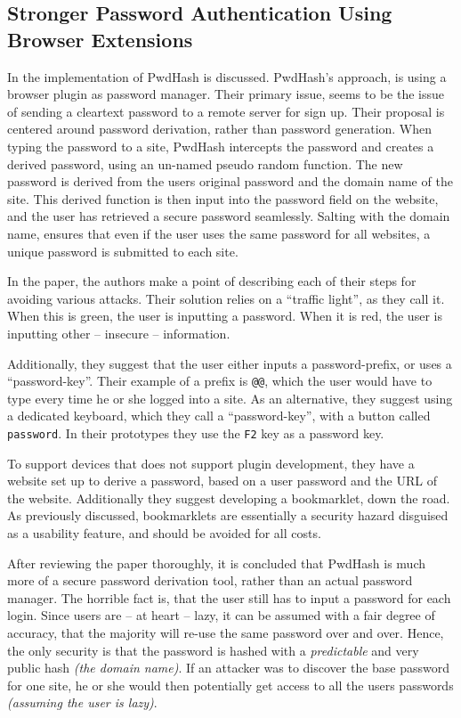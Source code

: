 		\subsection*{Stronger Password Authentication Using Browser Extensions}
			In \cite{pwdhash} the implementation of PwdHash is discussed. PwdHash's approach, is using a browser plugin as password manager. Their primary issue, seems to be the issue of sending a cleartext password to a remote server for sign up. Their proposal is centered around password derivation, rather than password generation. When typing the password to a site, PwdHash intercepts the password and creates a derived password, using an un-named pseudo random function. The new password is derived from the users original password and the domain name of the site. This derived function is then input into the password field on the website, and the user has retrieved a secure password seamlessly. Salting with the domain name, ensures that even if the user uses the same password for all websites, a unique password is submitted to each site.

			In the paper, the authors make a point of describing each of their steps for avoiding various attacks. Their solution relies on a ``traffic light'', as they call it. When this is green, the user is inputting a password. When it is red, the user is inputting other -- insecure -- information. 

			Additionally, they suggest that the user either inputs a password-prefix, or uses a ``password-key''. Their example of a prefix is \verb=@@=, which the user would have to type every time he or she logged into a site. As an alternative, they suggest using a dedicated keyboard, which they call a ``password-key'', with a button called \verb=password=. In their prototypes they use the \verb=F2= key as a password key.

			To support devices that does not support plugin development, they have a website set up to derive a password, based on a user password and the URL of the website. Additionally they suggest developing a bookmarklet, down the road. As previously discussed, bookmarklets are essentially a security hazard disguised as a usability feature, and should be avoided for all costs.


			After reviewing the paper thoroughly, it is concluded that PwdHash is much more of a secure password derivation tool, rather than an actual password manager. The horrible fact is, that the user still has to input a password for each login. Since users are -- at heart -- lazy, it can be assumed with a fair degree of accuracy, that the majority will re-use the same password over and over. Hence, the only security is that the password is hashed with a \emph{predictable} and very public hash \emph{(the domain name)}. If an attacker was to discover the base password for one site, he or she would then potentially get access to all the users passwords \emph{(assuming the user is lazy)}.

